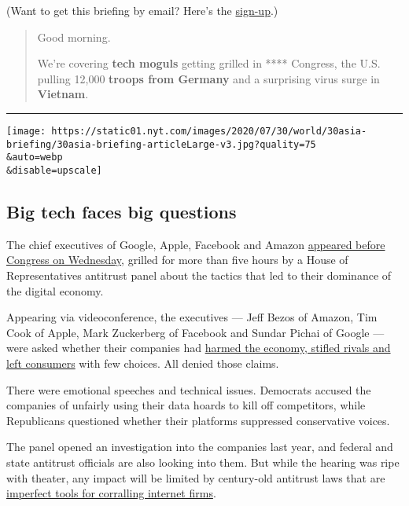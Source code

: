 (Want to get this briefing by email? Here's the
\href{https://www.nytimes.com/morning-briefing}{sign-up}.)

\begin{quote}
Good morning.

We're covering \textbf{tech moguls} getting grilled in **** Congress,
the U.S. pulling 12,000 \textbf{troops from Germany} and a surprising
virus surge in \textbf{Vietnam}.
\end{quote}

\begin{center}\rule{0.5\linewidth}{\linethickness}\end{center}

\texttt{[image: https://static01.nyt.com/images/2020/07/30/world/30asia-briefing/30asia-briefing-articleLarge-v3.jpg?quality=75\\\&auto=webp\\\&disable=upscale]}

\hypertarget{big-tech-faces-big-questions}{%
\subsection{Big tech faces big
questions}\label{big-tech-faces-big-questions}}

The chief executives of Google, Apple, Facebook and Amazon
\href{https://www.nytimes.com/2020/07/29/technology/big-tech-hearing-apple-amazon-facebook-google.html}{appeared
before Congress on Wednesday}, grilled for more than five hours by a
House of Representatives antitrust panel about the tactics that led to
their dominance of the digital economy.

Appearing via videoconference, the executives --- Jeff Bezos of Amazon,
Tim Cook of Apple, Mark Zuckerberg of Facebook and Sundar Pichai of
Google --- were asked whether their companies had
\href{https://www.nytimes.com/2020/07/28/technology/amazon-apple-facebook-google-antitrust-hearing.html}{harmed
the economy, stifled rivals and left consumers} with few choices. All
denied those claims.

There were emotional speeches and technical issues. Democrats accused
the companies of unfairly using their data hoards to kill off
competitors, while Republicans questioned whether their platforms
suppressed conservative voices.

The panel opened an investigation into the companies last year, and
federal and state antitrust officials are also looking into them. But
while the hearing was ripe with theater, any impact will be limited by
century-old antitrust laws that are
\href{https://www.nytimes.com/2018/09/07/technology/monopoly-antitrust-lina-khan-amazon.html}{imperfect
tools for corralling internet firms}.

